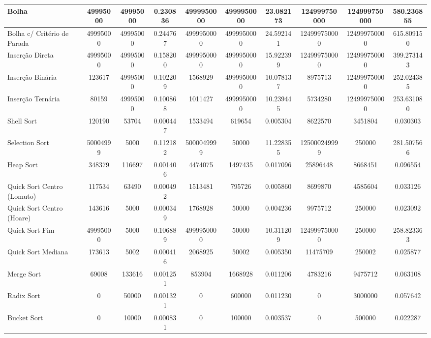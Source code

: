 \documentclass[12pt]{article}
\begin{document}
\begin{table}[H]
{\begin{tabular}{|l|c|c|c|c|c|c|c|c|c|}
Bolha & 49995000 & 49995000 & 0.230836 & 4999950000 & 4999950000 & 23.082173 & 124999750000 & 124999750000 & 580.236855 \\ \hline
Bolha c/ Critério de Parada & 49995000 & 49995000 & 0.244767 & 4999950000 & 4999950000 & 24.592141 & 124999750000 & 124999750000 & 615.809150 \\ \hline
Inserção Direta & 49995000 & 49995000 & 0.158200 & 4999950000 & 4999950000 & 15.922399 & 124999750000 & 124999750000 & 399.273143 \\ \hline
Inserção Binária & 123617 & 49995000 & 0.102209 & 1568929 & 4999950000 & 10.078137 & 8975713 & 124999750000 & 252.024385 \\ \hline
Inserção Ternária & 80159 & 49995000 & 0.100868 & 1011427 & 4999950000 & 10.239445 & 5734280 & 124999750000 & 253.631080 \\ \hline
Shell Sort & 120190 & 53704 & 0.000447 & 1533494 & 619654 & 0.005304 & 8622570 & 3451804 & 0.030303 \\ \hline
Selection Sort & 50004999 & 5000 & 0.112182 & 5000049999 & 50000 & 11.228355 & 125000249999 & 250000 & 281.507566 \\ \hline
Heap Sort & 348379 & 116697 & 0.001406 & 4474075 & 1497435 & 0.017096 & 25896448 & 8668451 & 0.096554 \\ \hline
Quick Sort Centro (Lomuto) & 117534 & 63490 & 0.000492 & 1513481 & 795726 & 0.005860 & 8699870 & 4585604 & 0.033126 \\ \hline
Quick Sort Centro (Hoare) & 143616 & 5000 & 0.000349 & 1768928 & 50000 & 0.004236 & 9975712 & 250000 & 0.023092 \\ \hline
Quick Sort Fim & 49995000 & 5000 & 0.106889 & 4999950000 & 50000 & 10.311209 & 124999750000 & 250000 & 258.823363 \\ \hline
Quick Sort Mediana & 173613 & 5002 & 0.000416 & 2068925 & 50002 & 0.005350 & 11475709 & 250002 & 0.025877 \\ \hline
Merge Sort & 69008 & 133616 & 0.001251 & 853904 & 1668928 & 0.011206 & 4783216 & 9475712 & 0.063108 \\ \hline
Radix Sort &0 & 50000 & 0.001321 & 0 & 600000 & 0.011230 & 0 & 3000000 & 0.057642 \\ \hline
Bucket Sort & 0 & 10000 & 0.000831 & 0 & 100000 & 0.003537 & 0 & 500000 & 0.022287 \\ \hline

\end{tabular}
}
\end{table}
\end{document}
